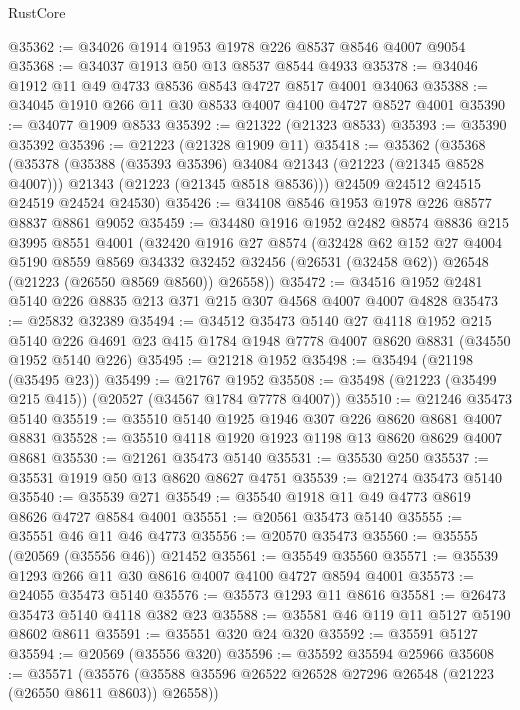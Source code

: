 \begin{lexlean}{RustCore}
\begin{coremodule}
@35362 := @34026 @1914 @1953 @1978 @226 @8537 @8546 @4007 @9054
@35368 := @34037 @1913 @50 @13 @8537 @8544 @4933
@35378 := @34046 @1912 @11 @49 @4733 @8536 @8543 @4727 @8517 @4001 @34063
@35388 := @34045 @1910 @266 @11 @30 @8533 @4007 @4100 @4727 @8527 @4001
@35390 := @34077 @1909 @8533
@35392 := @21322 (@21323 @8533)
@35393 := @35390 @35392
@35396 := @21223 (@21328 @1909 @11)
@35418 := @35362
    (@35368
      (@35378
        (@35388 (@35393 @35396) @34084 @21343 (@21223 (@21345 @8528 @4007)))
        @21343
        (@21223 (@21345 @8518 @8536)))
      @24509
      @24512
      @24515
      @24519
      @24524
      @24530)
@35426 := @34108 @8546 @1953 @1978 @226 @8577 @8837 @8861 @9052
@35459 := @34480
    @1916
    @1952
    @2482
    @8574
    @8836
    @215
    @3995
    @8551
    @4001
    (@32420
      @1916
      @27
      @8574
      (@32428
        @62
        @152
        @27
        @4004
        @5190
        @8559
        @8569
        @34332
        @32452
        @32456
        (@26531 (@32458 @62))
        @26548
        (@21223 (@26550 @8569 @8560))
        @26558))
@35472 := @34516 @1952 @2481 @5140 @226 @8835 @213 @371 @215 @307 @4568 @4007 @4007 @4828
@35473 := @25832 @32389
@35494 := @34512
    @35473
    @5140
    @27
    @4118
    @1952
    @215
    @5140
    @226
    @4691
    @23
    @415
    @1784
    @1948
    @7778
    @4007
    @8620
    @8831
    (@34550 @1952 @5140 @226)
@35495 := @21218 @1952
@35498 := @35494 (@21198 (@35495 @23))
@35499 := @21767 @1952
@35508 := @35498 (@21223 (@35499 @215 @415)) (@20527 (@34567 @1784 @7778 @4007))
@35510 := @21246 @35473 @5140
@35519 := @35510 @5140 @1925 @1946 @307 @226 @8620 @8681 @4007 @8831
@35528 := @35510 @4118 @1920 @1923 @1198 @13 @8620 @8629 @4007 @8681
@35530 := @21261 @35473 @5140
@35531 := @35530 @250
@35537 := @35531 @1919 @50 @13 @8620 @8627 @4751
@35539 := @21274 @35473 @5140
@35540 := @35539 @271
@35549 := @35540 @1918 @11 @49 @4773 @8619 @8626 @4727 @8584 @4001
@35551 := @20561 @35473 @5140
@35555 := @35551 @46 @11 @46 @4773
@35556 := @20570 @35473
@35560 := @35555 (@20569 (@35556 @46)) @21452
@35561 := @35549 @35560
@35571 := @35539 @1293 @266 @11 @30 @8616 @4007 @4100 @4727 @8594 @4001
@35573 := @24055 @35473 @5140
@35576 := @35573 @1293 @11 @8616
@35581 := @26473 @35473 @5140 @4118 @382 @23
@35588 := @35581 @46 @119 @11 @5127 @5190 @8602 @8611
@35591 := @35551 @320 @24 @320
@35592 := @35591 @5127
@35594 := @20569 (@35556 @320)
@35596 := @35592 @35594 @25966
@35608 := @35571
    (@35576 (@35588 @35596 @26522 @26528 @27296 @26548 (@21223 (@26550 @8611 @8603)) @26558))

\end{coremodule}
\end{lexlean}
